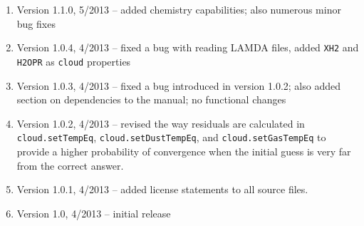 \documentclass[12pt]{article}
\begin{document}
\begin{enumerate}
\item Version 1.1.0, 5/2013 -- added chemistry capabilities; also numerous minor bug fixes
\item Version 1.0.4, 4/2013 -- fixed a bug with reading LAMDA files, added \verb|XH2| and \verb|H2OPR| as \verb|cloud| properties
\item Version 1.0.3, 4/2013 -- fixed a bug introduced in version 1.0.2; also added section on dependencies to the manual; no functional changes
\item Version 1.0.2, 4/2013 -- revised the way residuals are calculated in \verb=cloud.setTempEq=, \verb=cloud.setDustTempEq=, and \verb=cloud.setGasTempEq= to provide a higher probability of convergence when the initial guess is very far from the correct answer.
\item Version 1.0.1, 4/2013 -- added license statements to all source files.
\item Version 1.0, 4/2013 -- initial release
\end{enumerate}
\end{document}
